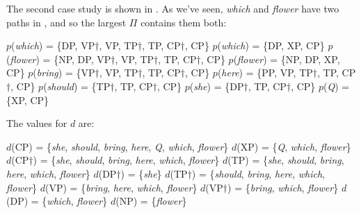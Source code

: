 \documentclass[output=paper]{langsci/langscibook}
\begin{document}
The second case study is shown in . As we've seen, \emph{which} and \emph{flower} have two paths in , and so the largest $\Pi$ contains them both:

\begin{exe}
	\ex \label{ex:bigpimulti3}
	\begin{xlist}
		\ex $p$(\emph{which}) = \{DP, VP$\dag$, VP, TP$\dag$, TP, CP$\dag$, CP\}
		\ex $p$(\emph{which}) = \{DP, XP, CP\}
		\ex $p$(\emph{flower}) = \{NP, DP, VP$\dag$, VP, TP$\dag$, TP, CP$\dag$, CP\}
		\ex $p$(\emph{flower}) = \{NP, DP, XP, CP\}
		\ex $p$(\emph{bring}) = \{VP$\dag$, VP, TP$\dag$, TP, CP$\dag$, CP\}
		\ex $p$(\emph{here}) = \{PP, VP, TP$\dag$, TP, CP$\dag$, CP\}
		\ex $p$(\emph{should}) = \{TP$\dag$, TP, CP$\dag$, CP\}
		\ex $p$(\emph{she}) = \{DP$\dag$, TP, CP$\dag$, CP\}
		\ex $p$(\emph{Q}) = \{XP, CP\}
	\end{xlist}
\end{exe}

The values for $d$ are:
\begin{exe}
	\ex \label{ex:bigdmulti3}
	\begin{xlist}
		\ex $d$(CP) = \{\emph{she}, \emph{should}, \emph{bring}, \emph{here}, \emph{Q}, \emph{which}, \emph{flower}\}
		\ex \label{ex:bdmulti3xp}$d$(XP) = \{\emph{Q}, \emph{which}, \emph{flower}\}
		\ex $d$(CP$\dag$) = \{\emph{she}, \emph{should}, \emph{bring}, \emph{here}, \emph{which}, \emph{flower}\}
		\ex $d$(TP) = \{\emph{she}, \emph{should}, \emph{bring}, \emph{here}, \emph{which}, \emph{flower}\}
		\ex $d$(DP$\dag$) = \{\emph{she}\}
		\ex $d$(TP$\dag$) = \{\emph{should}, \emph{bring}, \emph{here}, \emph{which}, \emph{flower}\}
		\ex \label{ex:vp} $d$(VP) = \{\emph{bring}, \emph{here}, \emph{which}, \emph{flower}\}
		\ex \label{ex:vpdag}$d$(VP$\dag$) = \{\emph{bring}, \emph{which}, \emph{flower}\}
		\ex $d$(DP) = \{\emph{which}, \emph{flower}\}
		\ex $d$(NP) = \{\emph{flower}\}
	\end{xlist}
\end{exe}
\end{document}
